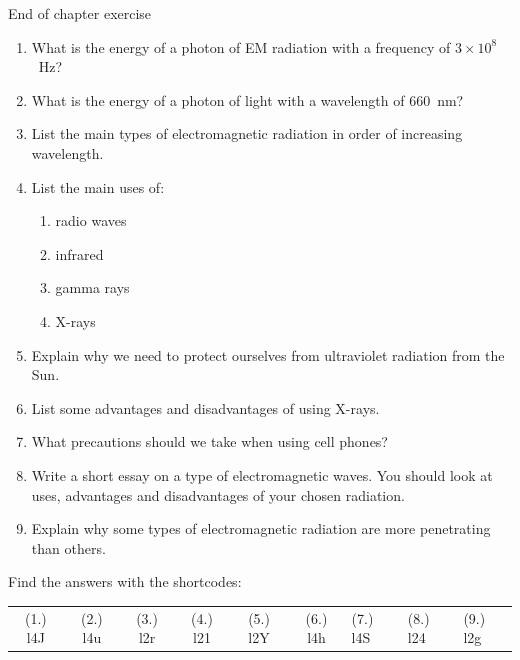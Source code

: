             \begin{eocexercises}{End of chapter exercise}
            \nopagebreak
      \label{m38779*id189872}\begin{enumerate}[noitemsep, label=\textbf{\arabic*}. ] 
            \label{m38779*uid34}\item What is the energy of a photon of EM radiation with a frequency of $3\ensuremath{\times}{10}^{8}$~Hz?\newline
\label{m38779*uid35}\item What is the energy of a photon of light with a wavelength of 660~nm?\newline
\label{m38779*uid36}\item List the main types of electromagnetic radiation in order of increasing wavelength.\newline
\label{m38779*uid37}\item List the main uses of:
\label{m38779*id189946}\begin{enumerate}[noitemsep, label=\textbf{\alph*}. ] 
            \label{m38779*uid38}\item radio waves
\label{m38779*uid39}\item infrared
\label{m38779*uid40}\item gamma rays
\label{m38779*uid41}\item X-rays
\end{enumerate}
                \label{m38779*uid42}\item Explain why we need to protect ourselves from ultraviolet radiation from the Sun.\newline
\label{m38779*uid43}\item List some advantages and disadvantages of using X-rays.\newline
\label{m38779*uid44}\item What precautions should we take when using cell phones?\newline
\label{m38779*uid45}\item Write a short essay on a type of electromagnetic waves. You should look at uses, advantages and disadvantages of your chosen radiation.\newline
\label{m38779*uid46}\item Explain why some types of electromagnetic radiation are more penetrating than others.\newline
\end{enumerate}
  \label{m38779**end}
  \label{459e2bef85baf867f5850bc8338cad3a**end}
\par {} Find the answers with the shortcodes:
 \par \begin{tabular}[h]{cccccc}
 (1.) l4J  &  (2.) l4u  &  (3.) l2r  &  (4.) l21  &  (5.) l2Y  &  (6.) l4h  &  (7.) l4S  &  (8.) l24  &  (9.) l2g  & \end{tabular}
\end{eocexercises}